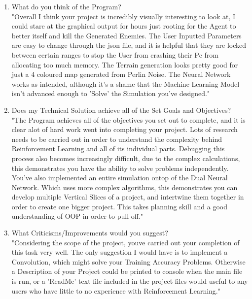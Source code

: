 \begin{flushleft}
        \begin{enumerate}
            \item What do you think of the Program? \\
                \vspace{0.2cm}
                "Overall I think your project is incredibly visually interesting to look at, I could stare at the graphical output for hours
                just rooting for the Agent to better itself and kill the Generated Enemies. The User Inputted Parameters are easy to change
                through the json file, and it is helpful that they are locked between certain ranges to stop the User from crashing their Pc
                from allocating too much memory. The Terrain generation looks pretty good for just a 4 coloured map generated from Perlin Noise.
                The Neural Network works as intended, although it's a shame that the Machine Learning Model isn't advanced enough to 'Solve' the
                Simulation you've designed."

            \item Does my Technical Solution achieve all of the Set Goals and Objectives? \\
                \vspace{0.2cm}
                "The Program achieves all of the objectives you set out to complete, and it is clear alot of hard work went into completing your
                project. Lots of research needs to be carried out in order to understand the complexity behind Reinforcement Learning and all
                of its individual parts. Debugging this process also becomes increasingly difficult, due to the complex calculations, this 
                demonstrates you have the ability to solve problems independently. \\
                \vspace{0.2cm}
                You've also implemented an entire simulation ontop of the Dual Neural Network. Which uses more complex algorithms, this demonstrates
                you can develop multiple Vertical Slices of a project, and intertwine them together in order to create one bigger project. This
                takes planning skill and a good understanding of OOP in order to pull off." \\

            \item What Criticisms/Improvements would you suggest? \\
                \vspace{0.2cm}
                "Considering the scope of the project, youve carried out your completion of this task very well. The only suggestion I would have is
                to implement a Convolution, which might solve your Training Accuracy Problems. Otherwise a Description of your Project could be
                printed to console when the main file is run, or a 'ReadMe' text file included in the project files would useful to any users who 
                have little to no experience with Reinforcement Learning." \\


\end{enumerate}
\end{flushleft}
